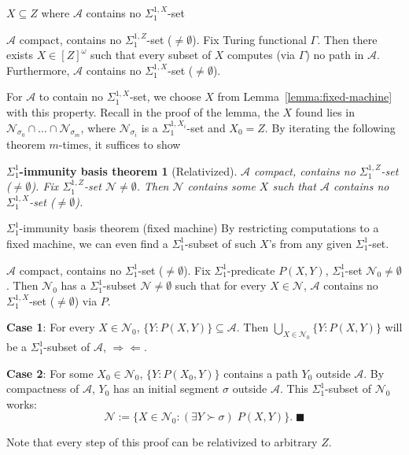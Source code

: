 \begin{frame}{$X\subseteq Z$ where $\mathcal{A}$ contains no
$\Sigma_1^{1,X}$-set}
  \begin{lemma-strengthened1*}
    $\mathcal{A}$ compact, contains no $\Sigma_1^{1,Z}$-set
    ($\neq\emptyset$). Fix Turing functional $\Gamma$. Then
    there exists $X\in[Z]^\omega$ such that every subset of $X$ computes
    (via $\Gamma$) no path in $\mathcal{A}$. Furthermore, $\mathcal{A}$
    contains no $\Sigma_1^{1,X}$-set ($\neq\emptyset$).
  \end{lemma-strengthened1*}

  \vspace{0.5em}
  For $\mathcal{A}$ to contain no $\Sigma_1^{1,X}$-set, we choose $X$ from
  Lemma~\ref{lemma:fixed-machine} with this property. Recall
  in the proof of the lemma, the $X$ found lies in
  $\mathcal{N}_{\sigma_0}\cap \ldots\cap\mathcal{N}_{\sigma_m}$,
  where $\mathcal{N}_{\sigma_i}$ is a $\Sigma_1^{1,X_i}$-set and $X_0=Z$.
  By iterating the following theorem $m$-times, it suffices to show

  \vspace{0.5em}
  \newtheorem*{immunity*}{$\Sigma_1^{1}$-immunity basis theorem}
  \begin{immunity*}[Relativized]
    $\mathcal{A}$ compact, contains no $\Sigma_1^{1,Z}$-set
    ($\neq\emptyset$). Fix $\Sigma_1^{1,Z}$-set
    $\mathcal{N}\neq\emptyset$. Then $\mathcal{N}$ contains some $X$ such
    that $\mathcal{A}$ contains no $\Sigma_1^{1,X}$-set ($\neq\emptyset$).
  \end{immunity*}
\end{frame}

\begin{frame}{$\Sigma_1^1$-immunity basis theorem (fixed machine)}
  By restricting computations to a fixed machine, we can even find a
  $\Sigma_1^1$-subset of such $X$'s from any given $\Sigma_1^1$-set.
  \begin{claim}
    $\mathcal{A}$ compact, contains no $\Sigma_1^{1}$-set
    ($\neq\emptyset$). Fix $\Sigma_1^{1}$-predicate $P(X,Y)$,
    $\Sigma_1^{1}$-set $\mathcal{N}_0\neq\emptyset$. Then $\mathcal{N}_0$
    has a $\Sigma_1^{1}$-subset $\mathcal{N}\neq\emptyset$ such that for
    every $X\in\mathcal{N}$, $\mathcal{A}$ contains no $\Sigma_1^{1,X}$-set
    ($\neq\emptyset$) via $P$.
  \end{claim}

  \textbf{Case 1}: For every $X\in\mathcal{N}_0$,
  $\{Y:P(X,Y)\}\subseteq\mathcal{A}$. Then $\bigcup_{X\in\mathcal{N}_0}
  \{Y:P(X,Y)\}$ will be a $\Sigma_1^1$-subset of $\mathcal{A}$,
  $\Rightarrow\Leftarrow$.

  \vspace{0.5em}
  \textbf{Case 2}: For some $X_0\in\mathcal{N}_0$, $\{Y:P(X_0,Y)\}$
  contains a path $Y_0$ outside $\mathcal{A}$. By compactness of
  $\mathcal{A}$, $Y_0$ has an initial segment $\sigma$ outside
  $\mathcal{A}$. This $\Sigma_1^1$-subset of $\mathcal{N}_0$ works:
  \[\mathcal{N}:= \{X\in\mathcal{N}_0: (\exists Y\succ\sigma)\; P(X,Y)\}.\;
  \blacksquare\]

  Note that every step of this proof can be relativized to arbitrary $Z$.
\end{frame}

